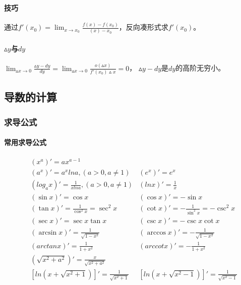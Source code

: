 \documentclass[
12pt, %
a4paper, 
oneside, %
headinclude,footinclude, %
]{scrartcl}
\begin{document}
\paragraph{技巧}
通过$ f'(x_0) = \lim_{x \to x_0}\frac{f(x)-f(x_0)}{(x) - x_0} $，反向凑形式求$ f'(x_0) $。
\paragraph{$ \vartriangle y $与$ dy $}
$ \lim_{\vartriangle x \to 0} \frac{\vartriangle y - dy}{dy} = \lim_{\vartriangle x \to 0} \frac{o(\vartriangle x)}{f'(x_0)\vartriangle x} = 0 $，
$ \vartriangle y - dy $是$ dy $的高阶无穷小。
\subsection[导数的计算]{导数的计算}
\subsubsection[求导公式]{求导公式}
\paragraph{常用求导公式}
\begin{align*}
&(x^a)' = ax^{a - 1} \\
&(a^x)' = a^x lna,(a > 0, a \neq 1) &(e^x)' = e^x \\
&(log_a x)' = \frac{1}{x lna},(a > 0, a \neq 1) &(ln x)' = \frac{1}{x}\\
&(\sin x)' = \cos x &(\cos x)' = -\sin x \\
&(\tan x)' = \frac{1}{\cos^2 x} = \sec^2 x &(\cot x)' = -\frac{1}{\sin^2 x} = -\csc^2 x \\
&(\sec x)' = \sec x \tan x &(\csc x)' = -\csc x \cot x \\
&(\arcsin x)' = \frac{1}{\sqrt{1 - x^2}} &(\arccos x)' = -\frac{1}{\sqrt{1 - x^2}} \\
&(arctan x)' = \frac{1}{1 + x^2} &(arccot x)' = -\frac{1}{1 + x^2} \\
&(\sqrt{x^2 + a^2})' = \frac{x}{\sqrt{x^2 + a^2}} \\
&[ln(x + \sqrt{x^2 + 1})]' = \frac{1}{\sqrt{x^2 + 1}} &[ln(x + \sqrt{x^2 - 1})]' = \frac{1}{\sqrt{x^2 - 1}} 
\end{align*}
\end{document}
